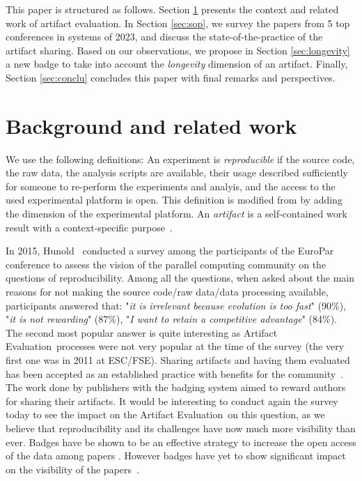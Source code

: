 \documentclass[sigconf,natbib=false]{acmart}
\newcommand{\aeval}{Artifact Evaluation}
\begin{document}
This paper is structured as follows.
Section \ref{sec:background} presents the context and related work of artifact evaluation.
In Section \ref{sec:sop}, we survey the papers from 5 top conferences in systems of 2023, and discuss the state-of-the-practice of the artifact sharing.
Based on our observations, we propose in Section \ref{sec:longevity} a new badge to take into account the \emph{longevity} dimension of an artifact.
Finally, Section \ref{sec:conclu} concludes this paper with final remarks and perspectives.

%
\section{Background and related work}\label{sec:background}

We use the following definitions:
An experiment is \emph{reproducible} if the source code, the raw data, the analysis scripts are available, their usage described sufficiently for someone to re-perform the experiments and analyis, and the access to the used experimental platform is open.
This definition is modified from \cite{rougier2019rescience} by adding the dimension of the experimental platform.
An \emph{artifact} is a self-contained work result with a context-specific purpose\ \cite{mendez2019artefacts}.

In 2015, Hunold\ \cite{hunold2015survey} conducted a survey among the participants of the EuroPar conference to assess the vision of the parallel computing community on the questions of reproducibility. 
Among all the questions, when asked about the main reasons for not making the source code/raw data/data processing available, participants answered that: "\emph{it is irrelevant because evolution is too fast}" (90\%), "\emph{it is not rewarding}" (87\%), "\emph{I want to retain a competitive advantage}" (84\%).
The second most popular answer is quite interesting as \aeval\ processes were not very popular at the time of the survey (the very first one was in 2011 at ESC/FSE).
Sharing artifacts and having them evaluated has been accepted as an established practice with benefits for the community\ \cite{hermann2022has}.
The work done by publishers with the badging system aimed to reward authors for sharing their artifacts.
It would be interesting to conduct again the survey today to see the impact on the \aeval\ on this question, as we believe that reproducibility and its challenges have now much more visibility than ever.
Badges have be shown to be an effective strategy to increase the open access of the data among papers \cite{kidwell2016badges, rowhani2017incentives}.
However badges have yet to show significant impact on the visibility of the papers\ \cite{winter2022retrospective}. 
\end{document}
